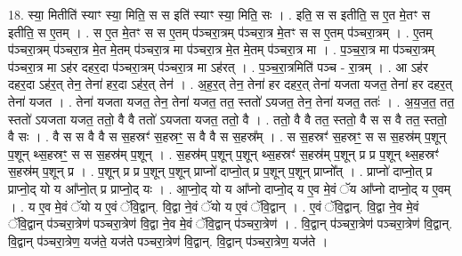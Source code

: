 \documentclass[17pt]{extarticle}
\begin{document}
18. स्या॒ मितीति॑ स्याꣳ स्या॒ मिति॒ स स इति॑ स्याꣳ स्या॒ मिति॒ सः । . इति॒ स स इतीति॒ स ए॒त मे॒तꣳ स इतीति॒ स ए॒तम् । . स ए॒त मे॒तꣳ स स ए॒तम् प॑ञ्चरा॒त्रम् प॑ञ्चरा॒त्र मे॒तꣳ स स ए॒तम् प॑ञ्चरा॒त्रम् । . ए॒तम् प॑ञ्चरा॒त्रम् प॑ञ्चरा॒त्र मे॒त मे॒तम् प॑ञ्चरा॒त्र मा प॑ञ्चरा॒त्र मे॒त मे॒तम् प॑ञ्चरा॒त्र मा । . प॒ञ्च॒रा॒त्र मा प॑ञ्चरा॒त्रम् प॑ञ्चरा॒त्र मा ऽह॑र दहर॒दा प॑ञ्चरा॒त्रम् प॑ञ्चरा॒त्र मा ऽह॑रत् । . प॒ञ्च॒रा॒त्रमिति॑ पञ्च - रा॒त्रम् । . आ ऽह॑र दहर॒दा ऽह॑र॒त् तेन॒ तेना॑ हर॒दा ऽह॑र॒त् तेन॑ । . अ॒ह॒र॒त् तेन॒ तेना॑ हर दहर॒त् तेना॑ यजता यजत॒ तेना॑ हर दहर॒त् तेना॑ यजत । . तेना॑ यजता यजत॒ तेन॒ तेना॑ यजत॒ तत॒ स्ततो॑ ऽयजत॒ तेन॒ तेना॑ यजत॒ ततः॑ । . अ॒य॒ज॒त॒ तत॒ स्ततो॑ ऽयजता यजत॒ ततो॒ वै वै ततो॑ ऽयजता यजत॒ ततो॒ वै । . ततो॒ वै वै तत॒ स्ततो॒ वै स स वै तत॒ स्ततो॒ वै सः । . वै स स वै वै स स॒हस्रꣳ॑ स॒हस्रꣳ॒॒ स वै वै स स॒हस्र᳚म् । . स स॒हस्रꣳ॑ स॒हस्रꣳ॒॒ स स स॒हस्र॑म् प॒शून् प॒शून् थ्स॒हस्रꣳ॒॒ स स स॒हस्र॑म् प॒शून् । . स॒हस्र॑म् प॒शून् प॒शून् थ्स॒हस्रꣳ॑ स॒हस्र॑म् प॒शून् प्र प्र प॒शून् थ्स॒हस्रꣳ॑ स॒हस्र॑म् प॒शून् प्र । . प॒शून् प्र प्र प॒शून् प॒शून् प्राप्नो॑ दाप्नो॒त् प्र प॒शून् प॒शून् प्राप्नो᳚त् । . प्राप्नो॑ दाप्नो॒त् प्र प्राप्नो॒द् यो य आ᳚प्नो॒त् प्र प्राप्नो॒द् यः । . आ॒प्नो॒द् यो य आ᳚प्नो दाप्नो॒द् य ए॒व मे॒वं ॅय आ᳚प्नो दाप्नो॒द् य ए॒वम् । . य ए॒व मे॒वं ॅयो य ए॒वं ॅवि॒द्वान्. वि॒द्वा ने॒वं ॅयो य ए॒वं ॅवि॒द्वान् । . ए॒वं ॅवि॒द्वान्. वि॒द्वा ने॒व मे॒वं ॅवि॒द्वान् प॑ञ्चरा॒त्रेण॑ पञ्चरा॒त्रेण॑ वि॒द्वा ने॒व मे॒वं ॅवि॒द्वान् प॑ञ्चरा॒त्रेण॑ । . वि॒द्वान् प॑ञ्चरा॒त्रेण॑ पञ्चरा॒त्रेण॑ वि॒द्वान्. वि॒द्वान् प॑ञ्चरा॒त्रेण॒ यज॑ते॒ यज॑ते पञ्चरा॒त्रेण॑ वि॒द्वान्. वि॒द्वान् प॑ञ्चरा॒त्रेण॒ यज॑ते । \newline
\end{document}
